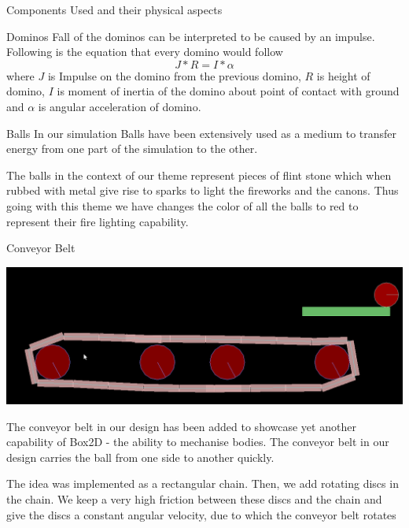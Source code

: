 \documentclass[a4paper,12pt]{article}
\begin{document}
\begin{section}{Components Used and their physical aspects}
\begin{subsection}{Dominos}
Fall of the dominos can be interpreted to be caused by an impulse. Following is the equation that every domino would follow
$$ J*R = I*\alpha $$
where \(J\) is Impulse on the domino from the previous domino, \(R\) is height of domino, \(I\) is moment of inertia of the domino about point of contact with ground and \(\alpha\) is angular acceleration of domino.
\end{subsection}

\begin{subsection}{Balls}
In our simulation Balls have been extensively used as a medium to transfer energy from one part of the simulation to
the other.

The balls in the context of our theme represent pieces of flint stone which when rubbed with metal give rise to sparks to light the fireworks and the canons. Thus going with this theme we have changes the color of all the balls to red to represent their fire lighting capability.
\end{subsection}

\begin{subsection}{Conveyor Belt}
\begin{center}
\includegraphics[scale=.25]{./Images/ConveyorBelt.png}
\end{center}
The conveyor belt in our design has been added to showcase yet another capability of Box2D - the ability to mechanise bodies. The conveyor belt in our design carries the ball from one side to another quickly.

The idea was implemented as a rectangular chain. Then, we add rotating discs in the chain. We keep a very high friction between these discs and the chain and give the discs a constant angular velocity, due to which the conveyor belt rotates
\end{subsection}


\end{section}
\end{document}
